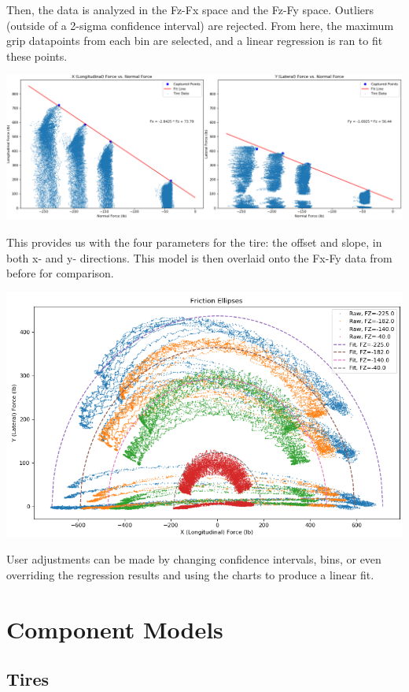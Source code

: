 \documentclass{article}
\begin{document}
Then, the data is analyzed in the Fz-Fx space and the Fz-Fy space. Outliers (outside of a 2-sigma confidence interval) are rejected. From here, the maximum grip datapoints from each bin are selected, and a linear regression is ran to fit these points.

\includegraphics[width=\textwidth]{fric_regression.png}

This provides us with the four parameters for the tire: the offset and slope, in both x- and y- directions. This model is then overlaid onto the Fx-Fy data from before for comparison.

\includegraphics[width=\textwidth]{fric_ellipses_fit.png}

User adjustments can be made by changing confidence intervals, bins, or even overriding the regression results and using the charts to produce a linear fit.

\section{Component Models}

\subsection{Tires}
\end{document}
